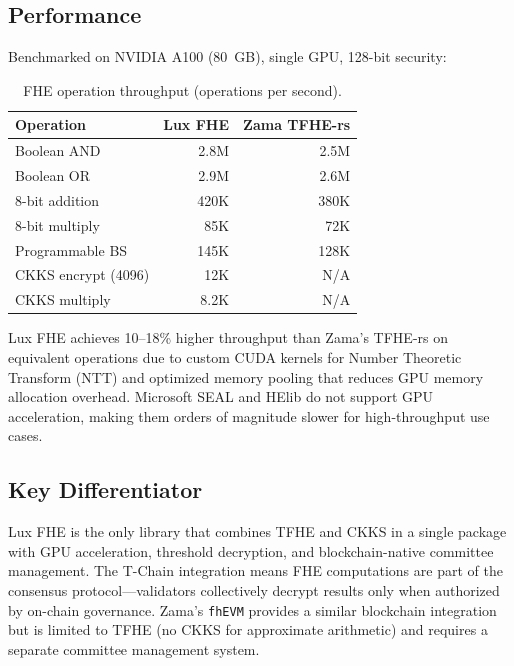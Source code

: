 \subsection{Performance}

Benchmarked on NVIDIA A100 (80~GB), single GPU, 128-bit security:

\begin{table}[H]
\centering
\caption{FHE operation throughput (operations per second).}
\footnotesize
\begin{tabular}{@{}lrr@{}}
\toprule
Operation & Lux FHE & Zama TFHE-rs \\
\midrule
Boolean AND & 2.8M & 2.5M \\
Boolean OR & 2.9M & 2.6M \\
8-bit addition & 420K & 380K \\
8-bit multiply & 85K & 72K \\
Programmable BS & 145K & 128K \\
CKKS encrypt (4096) & 12K & N/A \\
CKKS multiply & 8.2K & N/A \\
\bottomrule
\end{tabular}
\end{table}

Lux FHE achieves 10--18\% higher throughput than Zama's TFHE-rs on equivalent operations due to custom CUDA kernels for Number Theoretic Transform (NTT) and optimized memory pooling that reduces GPU memory allocation overhead. Microsoft SEAL and HElib do not support GPU acceleration, making them orders of magnitude slower for high-throughput use cases.

\subsection{Key Differentiator}

Lux FHE is the only library that combines TFHE and CKKS in a single package with GPU acceleration, threshold decryption, and blockchain-native committee management. The T-Chain integration means FHE computations are part of the consensus protocol---validators collectively decrypt results only when authorized by on-chain governance. Zama's \texttt{fhEVM} provides a similar blockchain integration but is limited to TFHE (no CKKS for approximate arithmetic) and requires a separate committee management system.

